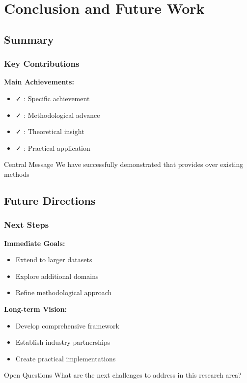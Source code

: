 \section{Conclusion and Future Work}

\subsection{Summary}
\begin{frame}
    \frametitle{Key Contributions}
    \textbf{Main Achievements:}
    \begin{itemize}
        \item ✓ : Specific achievement
        \item ✓ : Methodological advance
        \item ✓ : Theoretical insight
        \item ✓ : Practical application
    \end{itemize}
    
    \vspace{1em}
    \begin{block}{Central Message}
        We have successfully demonstrated that  
        provides  over existing methods
    \end{block}
\end{frame}

\subsection{Future Directions}
\begin{frame}
    \frametitle{Next Steps}
    \textbf{Immediate Goals:}
    \begin{itemize}
        \item Extend to larger datasets
        \item Explore additional domains
        \item Refine methodological approach
    \end{itemize}
    
    \vspace{1em}
    \textbf{Long-term Vision:}
    \begin{itemize}
        \item Develop comprehensive framework
        \item Establish industry partnerships
        \item Create practical implementations
    \end{itemize}
    
    \vspace{1em}
    \begin{alertblock}{Open Questions}
        What are the next challenges to address in this research area?
    \end{alertblock}
\end{frame}

